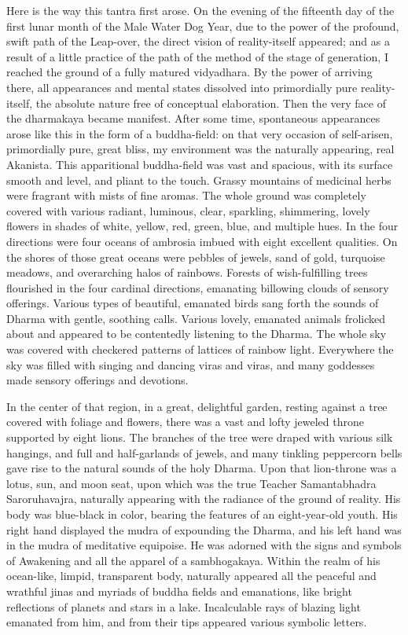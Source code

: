 \documentclass[a4paper,11pt,twoside,final]{book}
\begin{document}
Here is the way this tantra first arose. On the evening of the
fifteenth day of the first lunar month of the Male Water Dog Year, due
to the power of the profound, swift path of the Leap-over, the direct
vision of reality-itself appeared; and as a result of a little
practice of the path of the method of the stage of generation, I
reached the ground of a fully matured vidyadhara. By the power of
arriving there, all appearances and mental states dissolved into
primordially pure reality-itself, the absolute nature free of
conceptual elaboration. Then the very face of the dharmakaya became
manifest. After some time, spontaneous appearances arose like this in
the form of a buddha-field: on that very occasion of self-arisen,
primordially pure, great bliss, my environment was the naturally
appearing, real Akanista. This apparitional buddha-field was vast and
spacious, with its surface smooth and level, and pliant to the
touch. Grassy mountains of medicinal herbs were fragrant with mists of
fine aromas. The whole ground was completely covered with various
radiant, luminous, clear, sparkling, shimmering, lovely flowers in
shades of white, yellow, red, green, blue, and multiple hues. In the
four directions were four oceans of ambrosia imbued with eight
excellent qualities. On the shores of those great oceans were pebbles
of jewels, sand of gold, turquoise meadows, and overarching halos of
rainbows. Forests of wish-fulfilling trees flourished in the four
cardinal directions, emanating billowing clouds of sensory
offerings. Various types of beautiful, emanated birds sang forth the
sounds of Dharma with gentle, soothing calls. Various lovely, emanated
animals frolicked about and appeared to be contentedly listening to
the Dharma. The whole sky was covered with checkered patterns of
lattices of rainbow light. Everywhere the sky was filled with singing
and dancing viras and viras, and many goddesses made sensory offerings
and devotions.

In the center of that region, in a great, delightful garden, resting
against a tree covered with foliage and flowers, there was a vast and
lofty jeweled throne supported by eight lions. The branches of the
tree were draped with various silk hangings, and full and
half-garlands of jewels, and many tinkling peppercorn bells gave rise
to the natural sounds of the holy Dharma. Upon that lion-throne was a
lotus, sun, and moon seat, upon which was the true Teacher
Samantabhadra Saroruhavajra, naturally appearing with the radiance of
the ground of reality. His body was blue-black in color, bearing the
features of an eight-year-old youth. His right hand displayed the
mudra of expounding the Dharma, and his left hand was in the mudra of
meditative equipoise. He was adorned with the signs and symbols of
Awakening and all the apparel of a sambhogakaya. Within the realm of
his ocean-like, limpid, transparent body, naturally appeared all the
peaceful and wrathful jinas and myriads of buddha fields and
emanations, like bright reflections of planets and stars in a lake.
Incalculable rays of blazing light emanated from him, and from their
tips appeared various symbolic letters.
\end{document}
